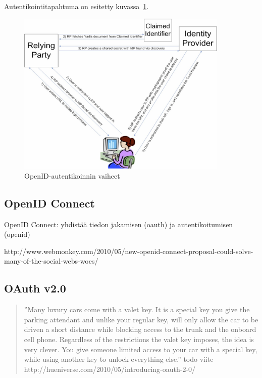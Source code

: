 \documentclass[finnish,gradu]{tktltiki}
\begin{document}
  Autentikointitapahtuma on esitetty kuvassa~\ref{fig:basic_openid_flow}.

  \begin{figure}
    \centering
    \includegraphics[width=0.9\textwidth]{images/openid_flow_recordon06.jpg}
    \caption{OpenID-autentikoinnin vaiheet~\cite{openid_2.0_platform_2009}}
    \label{fig:basic_openid_flow}
  \end{figure}

  \cite{openid_recordon_2009}

  \subsection{OpenID Connect} %
  \label{sub:openid_connect}
  OpenID Connect: yhdistää tiedon jakamisen (oauth) ja autentikoitumisen (openid)

  http://www.webmonkey.com/2010/05/new-openid-connect-proposal-could-solve-many-of-the-social-webs-woes/



  \subsection{OAuth v2.0} %
  \label{sub:oauth}

  \begin{quote}
    ''Many luxury cars come with a valet key. It is a special key you give the parking attendant and unlike your regular key, will only allow the car to be driven a short distance while blocking access to the trunk and the onboard cell phone. Regardless of the restrictions the valet key imposes, the idea is very clever. You give someone limited access to your car with a special key, while using another key to unlock everything else.''
    todo viite http://hueniverse.com/2010/05/introducing-oauth-2-0/
  \end{quote}
\end{document}
